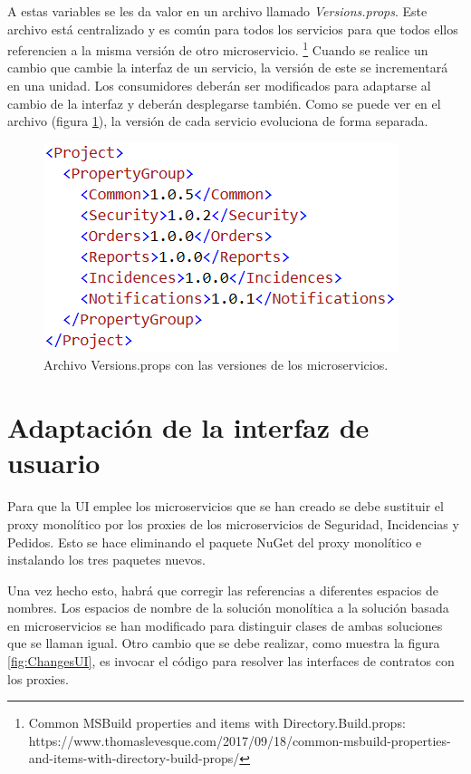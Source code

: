 \documentclass[11pt,spanish,listoffigures]{tfgetsinf}
\begin{document}
A estas variables se les da valor en un archivo llamado \textit{Versions.props}. Este archivo está centralizado y es común para todos los servicios para que todos ellos referencien a la misma versión de otro microservicio. \footnote{ Common MSBuild properties and items with Directory.Build.props: https://www.thomaslevesque.com/2017/09/18/common-msbuild-properties-and-items-with-directory-build-props/} Cuando se realice un cambio que cambie la interfaz de un servicio, la versión de este se incrementará en una unidad. Los consumidores deberán ser modificados para adaptarse al cambio de la interfaz y deberán desplegarse también. Como se puede ver en el archivo (figura \ref{fig:Versionsprops}), la versión de cada servicio evoluciona de forma separada.

\begin{figure}[h]
\centering
\includegraphics[scale=0.9]{Versionsprops}
\caption{Archivo Versions.props con las versiones de los microservicios.}
\label{fig:Versionsprops}
\end{figure}

\newpage

\section{Adaptación de la interfaz de usuario}

Para que la UI emplee los microservicios que se han creado se debe sustituir el proxy monolítico por los proxies de los microservicios de Seguridad, Incidencias y Pedidos. Esto se hace eliminando el paquete NuGet del proxy monolítico e instalando los tres paquetes nuevos.

Una vez hecho esto, habrá que corregir las referencias a diferentes espacios de nombres. Los espacios de nombre de la solución monolítica a la solución basada en microservicios se han modificado para distinguir clases de ambas soluciones que se llaman igual. Otro cambio que se debe realizar, como muestra la figura \ref{fig:ChangesUI}, es invocar el código para resolver las interfaces de contratos con los proxies.
\end{document}
